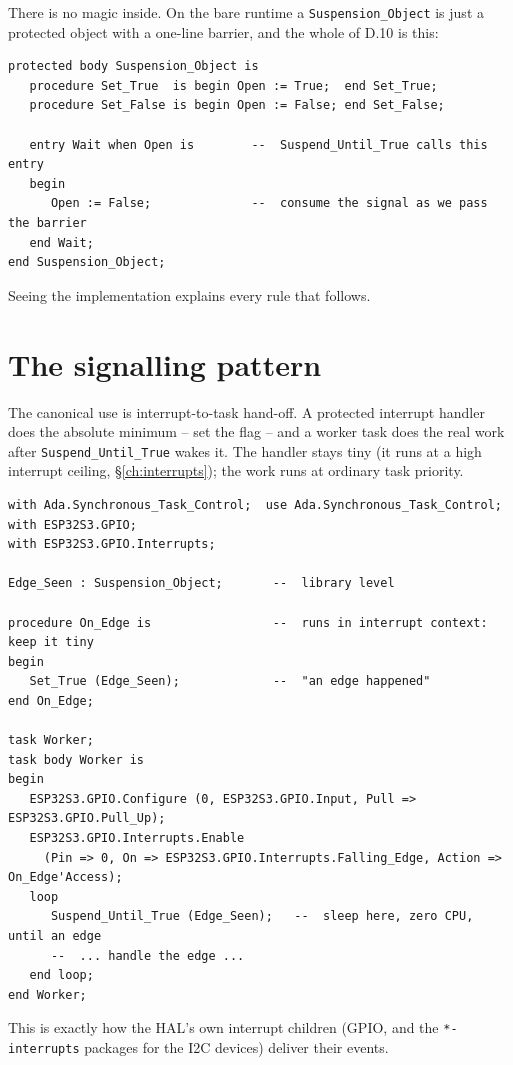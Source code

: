 There is no magic inside. On the bare runtime a \texttt{Suspension\_Object} is just
a protected object with a one-line barrier, and the whole of D.10 is this:

\begin{lstlisting}
protected body Suspension_Object is
   procedure Set_True  is begin Open := True;  end Set_True;
   procedure Set_False is begin Open := False; end Set_False;

   entry Wait when Open is        --  Suspend_Until_True calls this entry
   begin
      Open := False;              --  consume the signal as we pass the barrier
   end Wait;
end Suspension_Object;
\end{lstlisting}

Seeing the implementation explains every rule that follows.

\section{The signalling pattern}

The canonical use is interrupt-to-task hand-off. A protected interrupt handler does
the absolute minimum -- set the flag -- and a worker task does the real work after
\texttt{Suspend\_Until\_True} wakes it. The handler stays tiny (it runs at a high
interrupt ceiling, \S\ref{ch:interrupts}); the work runs at ordinary task priority.

\begin{lstlisting}
with Ada.Synchronous_Task_Control;  use Ada.Synchronous_Task_Control;
with ESP32S3.GPIO;
with ESP32S3.GPIO.Interrupts;

Edge_Seen : Suspension_Object;       --  library level

procedure On_Edge is                 --  runs in interrupt context: keep it tiny
begin
   Set_True (Edge_Seen);             --  "an edge happened"
end On_Edge;

task Worker;
task body Worker is
begin
   ESP32S3.GPIO.Configure (0, ESP32S3.GPIO.Input, Pull => ESP32S3.GPIO.Pull_Up);
   ESP32S3.GPIO.Interrupts.Enable
     (Pin => 0, On => ESP32S3.GPIO.Interrupts.Falling_Edge, Action => On_Edge'Access);
   loop
      Suspend_Until_True (Edge_Seen);   --  sleep here, zero CPU, until an edge
      --  ... handle the edge ...
   end loop;
end Worker;
\end{lstlisting}

This is exactly how the HAL's own interrupt children (GPIO, and the
\texttt{*-interrupts} packages for the I2C devices) deliver their events.


